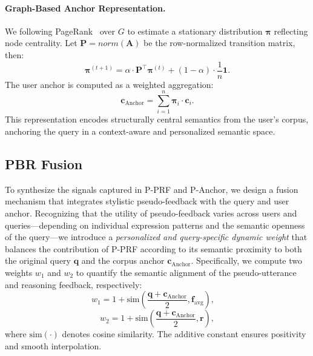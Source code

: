 \paragraph{Graph-Based Anchor Representation.}
We following PageRank~\cite{page1999pagerank,haveliwala2002topic}  over $G$ to estimate a stationary distribution $\boldsymbol{\pi}$ reflecting node centrality. Let $\mathbf{P}=norm(\mathbf{A})$ be the row-normalized transition matrix, then:
\begin{equation}
\boldsymbol{\pi}^{(t+1)} = \alpha \cdot \mathbf{P}^\top \boldsymbol{\pi}^{(t)} + (1 - \alpha) \cdot \frac{1}{n} \mathbf{1}.
\end{equation}
The user anchor is computed as a weighted aggregation:
\begin{equation}
\mathbf{c}_{\text{Anchor}} = \sum_{i=1}^{n} \boldsymbol{\pi}_i \cdot \mathbf{c}_i.
\end{equation}
This representation encodes structurally central semantics from the user's corpus, anchoring the query in a context-aware and personalized semantic space.




\subsection{PBR Fusion}  

To synthesize the signals captured in P-PRF and P-Anchor, we design a fusion mechanism that integrates stylistic pseudo-feedback with the query and user anchor. Recognizing that the utility of pseudo-feedback varies across users and queries—depending on individual expression patterns and the semantic openness of the query—we introduce a \textit{personalized and query-specific dynamic weight} that balances the contribution of P-PRF according to its semantic proximity to both the original query $\mathbf{q}$ and the corpus anchor $\mathbf{c}_{\text{Anchor}}$. Specifically, we compute two weights $w_1$ and $w_2$ to quantify the semantic alignment of the pseudo-utterance and reasoning feedback, respectively:
\begin{equation}
w_1 = 1 + \text{sim}\left( \frac{\mathbf{q} + \mathbf{c}_{\text{Anchor}}}{2}, \mathbf{f}_{\text{avg}} \right), \quad
\end{equation}
\begin{equation}
w_2 = 1 + \text{sim}\left( \frac{\mathbf{q} + \mathbf{c}_{\text{Anchor}}}{2}, \mathbf{r} \right),
\end{equation}
where $\text{sim}(\cdot)$ denotes cosine similarity. The additive constant ensures positivity and smooth interpolation.

